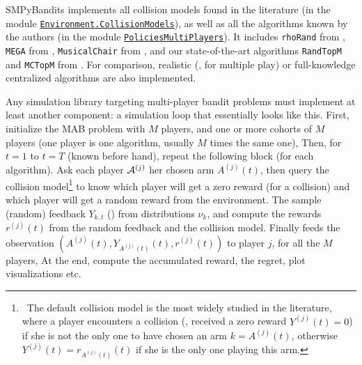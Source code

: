 SMPyBandits implements all collision models found in the literature (in the module \texttt{\href{https://SMPyBandits.GitHub.io/docs/Environment.CollisionModels.html}{Environment.CollisionModels}}), as well as all the algorithms known by the authors (in the module \texttt{\href{https://SMPyBandits.GitHub.io/docs/PoliciesMultiPlayers.html}{PoliciesMultiPlayers}}).
%
It includes
\texttt{rhoRand}
from \cite{Anandkumar11},
\texttt{MEGA}
from \cite{Avner15},
\texttt{MusicalChair}
from \cite{Rosenski16},
and our state-of-the-art algorithms
\texttt{RandTopM}
and \texttt{MCTopM}
from \cite{Besson2018ALT}.
For comparison, realistic (\eg, \UCB{} for multiple play) or full-knowledge centralized algorithms are also implemented.

Any simulation library targeting multi-player bandit problems must implement at least another component:
a simulation loop that essentially looks like this.
    First, initialize the MAB problem with $M$ players, and one or more cohorts of $M$ players (one player is one algorithm, usually $M$ times the same one),
    Then, for $t=1$ to $t=T$ (known before hand), repeat the following block (for each algorithm). Ask each player $\mathcal{A}^{(j)}$ her chosen arm $A^{(j)}(t)$, then query the collision model\footnote{~The default collision model is the most widely studied in the literature, where a player encounters a collision (\ie, received a zero reward $Y^{(j)}(t)=0$) if she is not the only one to have chosen an arm $k=A^{(j)}(t)$, otherwise $Y^{(j)}(t)=r_{A^{(j)}(t)}(t)$ if she is the only one playing this arm.} to know which player will get a zero reward (for a collision) and which player will get a random reward from the environment. The
    sample (random) feedback $Y_{k,t}$ (\iid) from distributions $\nu_{k}$, and compute the rewards $r^{(j)}(t)$ from the random feedback and the collision model. Finally feeds the observation $(A^{(j)}(t), Y_{A^{(j)}(t)}(t), r^{(j)}(t))$ to player $j$, for all the $M$ players,
    At the end, compute the accumulated reward, the regret, plot visualizations etc.


